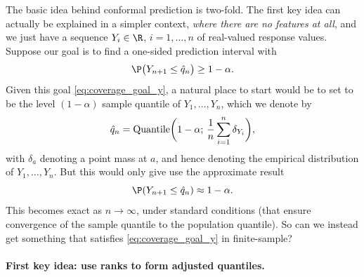\documentclass{article}
\begin{document}
The basic idea behind conformal prediction is two-fold. The first key idea can
actually be explained in a simpler context, \emph{where there are no features at
  all}, and we just have a sequence $Y_i \in \R$, $i=1,\dots,n$ of real-valued
response values. Suppose our goal is to find a one-sided prediction interval
\smash{$\hC_n = (-\infty, \hq_n]$} with
\begin{equation}
\label{eq:coverage_goal_y}
\P\big( Y_{n+1} \leq \hq_n \big) \geq 1-\alpha.
\end{equation}
Given this goal \eqref{eq:coverage_goal_y}, a natural place to start would be to
set  to be the level $(1-\alpha)$ sample quantile of
$Y_1,\dots,Y_n$, which we denote by  
\[
\hat{q}_n = \mathrm{Quantile}\bigg( 1-\alpha; \, \frac{1}{n} \sum_{i=1}^n \delta_{Y_i}
\bigg), 
\]
with $\delta_a$ denoting a point mass at $a$, and hence  denoting the empirical distribution of
$Y_1,\dots,Y_n$. But this would only give use the approximate result 
\[
\P(Y_{n+1} \leq \hq_n) \approx 1-\alpha.
\]
This becomes exact as $n \to \infty$, under standard conditions (that ensure
convergence of the sample quantile to the population quantile). So can we
instead get something that satisfies \eqref{eq:coverage_goal_y} in
finite-sample?     

\paragraph{First key idea: use ranks to form adjusted quantiles.} 
\end{document}
